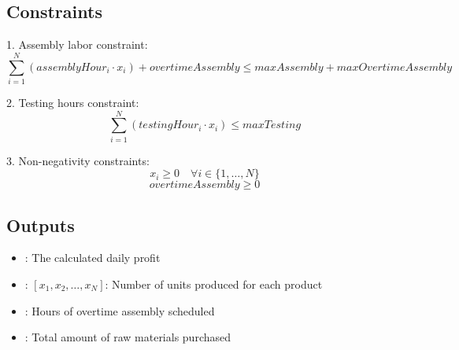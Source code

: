 \documentclass{article}
\begin{document}
\subsection*{Constraints}
1. Assembly labor constraint:
   \[
   \sum_{i=1}^{N} (assemblyHour_i \cdot x_i) + overtimeAssembly \leq maxAssembly + maxOvertimeAssembly
   \]
   
2. Testing hours constraint:
   \[
   \sum_{i=1}^{N} (testingHour_i \cdot x_i) \leq maxTesting
   \]

3. Non-negativity constraints:
   \[
   x_i \geq 0 \quad \forall i \in \{1, \ldots, N\}
   \]
   \[
   overtimeAssembly \geq 0
   \]

\subsection*{Outputs}
\begin{itemize}
    \item {}: The calculated daily profit
    \item {}: $[x_1, x_2, \ldots, x_N]$: Number of units produced for each product
    \item {}: Hours of overtime assembly scheduled
    \item {}: Total amount of raw materials purchased
\end{itemize}
\end{document}
